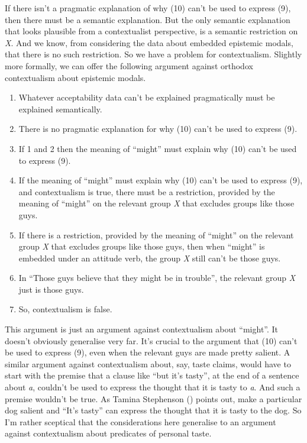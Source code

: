 \documentclass[
  11pt,
  letterpaper,
  DIV=11,
  numbers=noendperiod,
  twoside]{scrartcl}
\providecommand{\tightlist}{%
  \setlength{\itemsep}{0pt}\setlength{\parskip}{0pt}}
\begin{document}
If there isn't a pragmatic explanation of why (10) can't be used to
express (9), then there must be a semantic explanation. But the only
semantic explanation that looks plausible from a contextualist
perspective, is a semantic restriction on \emph{X}. And we know, from
considering the data about embedded epistemic modals, that there is no
such restriction. So we have a problem for contextualism. Slightly more
formally, we can offer the following argument against orthodox
contextualism about epistemic modals.

\begin{enumerate}
\def\labelenumi{\arabic{enumi}.}
\tightlist
\item
  Whatever acceptability data can't be explained pragmatically must be
  explained semantically.
\item
  There is no pragmatic explanation for why (10) can't be used to
  express (9).
\item
  If 1 and 2 then the meaning of ``might'' must explain why (10) can't
  be used to express (9).
\item
  If the meaning of ``might'' must explain why (10) can't be used to
  express (9), and contextualism is true, there must be a restriction,
  provided by the meaning of ``might'' on the relevant group \emph{X}
  that excludes groups like those guys.
\item
  If there is a restriction, provided by the meaning of ``might'' on the
  relevant group \emph{X} that excludes groups like those guys, then
  when ``might'' is embedded under an attitude verb, the group \emph{X}
  still can't be those guys.
\item
  In ``Those guys believe that they might be in trouble'', the relevant
  group \emph{X} just is those guys.
\item
  So, contextualism is false.
\end{enumerate}

This argument is just an argument against contextualism about ``might''.
It doesn't obviously generalise very far. It's crucial to the argument
that (10) can't be used to express (9), even when the relevant guys are
made pretty salient. A similar argument against contextualism about,
say, taste claims, would have to start with the premise that a clause
like ``but it's tasty'', at the end of a sentence about \emph{a},
couldn't be used to express the thought that it is tasty to \emph{a}.
And such a premise wouldn't be true. As Tamina Stephenson
() points out, make a particular dog
salient and ``It's tasty'' can express the thought that it is tasty to
the dog. So I'm rather sceptical that the considerations here generalise
to an argument against contextualism about predicates of personal taste.
\end{document}
